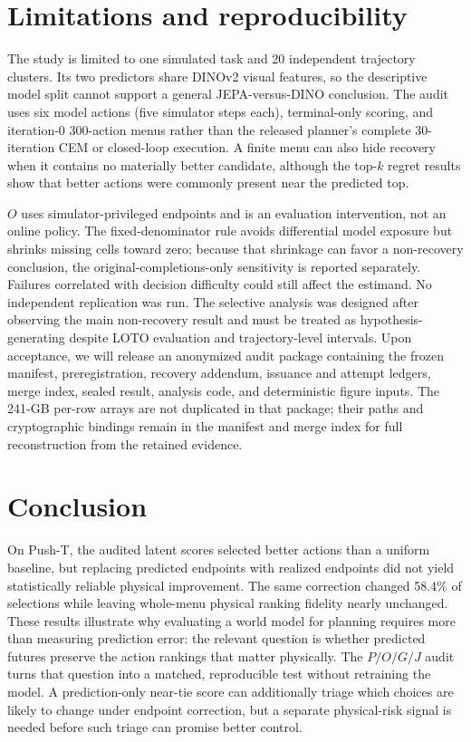 \documentclass[letterpaper,10pt,conference]{ieeeconf}
\begin{document}
\section{Limitations and reproducibility}

The study is limited to one simulated task and 20 independent trajectory
clusters. Its two predictors share DINOv2 visual features, so the descriptive
model split cannot support a general JEPA-versus-DINO conclusion. The audit
uses six model actions (five simulator steps each), terminal-only scoring, and
iteration-0 300-action menus rather than the released planner's complete
30-iteration CEM or closed-loop execution. A finite menu can also hide recovery
when it contains no materially better candidate, although the top-$k$ regret
results show that better actions were commonly present near the predicted top.

$O$ uses simulator-privileged endpoints and is an evaluation intervention, not
an online policy. The fixed-denominator rule avoids differential model exposure
but shrinks missing cells toward zero; because that shrinkage can favor a
non-recovery conclusion, the original-completions-only sensitivity is reported
separately. Failures correlated with decision difficulty could still affect the
estimand. No independent
replication was run. The selective analysis was designed after observing the
main non-recovery result and must be treated as hypothesis-generating despite
LOTO evaluation and trajectory-level intervals. Upon acceptance, we will
release an anonymized audit package containing the frozen manifest,
preregistration, recovery addendum, issuance and attempt ledgers, merge index,
sealed result, analysis code, and deterministic figure inputs. The 241-GB
per-row arrays are not duplicated
in that package; their paths and cryptographic bindings remain in the manifest
and merge index for full reconstruction from the retained evidence.

\section{Conclusion}

On Push-T, the audited latent scores selected better actions than a uniform
baseline, but replacing predicted endpoints with realized endpoints did not
yield statistically reliable physical improvement. The same correction changed
58.4\% of selections while leaving whole-menu physical ranking fidelity nearly
unchanged. These results illustrate why evaluating a world model for planning
requires more than measuring prediction error: the relevant question is whether
predicted futures preserve the action rankings that matter physically. The
$P/O/G/J$ audit turns that question into a matched, reproducible test without
retraining the model. A prediction-only near-tie score can additionally triage
which choices are likely to change under endpoint correction, but a separate
physical-risk signal is needed before such triage can promise better control.



\end{document}
